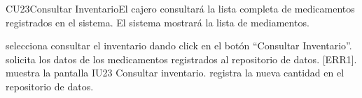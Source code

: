 \begin{UseCase}{CU23}{Consultar Inventario}{El cajero consultará la lista completa de medicamentos registrados en el sistema. El sistema mostrará la lista de mediamentos.}
	
\end{UseCase}

\begin{UCtrayectoria}{}
		\UCpaso[\UCactor] selecciona consultar el inventario dando click en el botón ``Consultar Inventario''.
		\UCpaso solicita los datos de los medicamentos registrados al repositorio de datos. [ERR1].
		\UCpaso muestra la pantalla IU23 Consultar inventario. registra la nueva cantidad en el repositorio de datos.
\end{UCtrayectoria}
